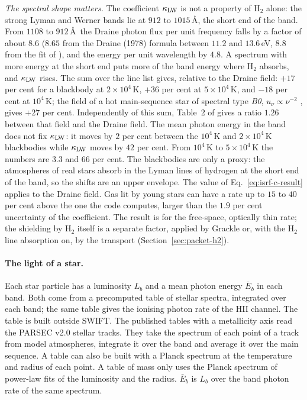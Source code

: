 \emph{The spectral shape matters.} The coefficient $\kappa_{\rm LW}$ is not a property of
H$_2$ alone: the strong Lyman and Werner bands lie at $912$ to $1015$\,\AA,
the short end of the band. From $1108$ to $912$\,\AA\ the Draine photon flux per
unit frequency falls by a factor of about $8.6$ ($8.65$ from the Draine (1978) formula between
$11.2$ and $13.6$\,eV, $8.8$ from the fit of \citealt{Sternberg2014}), and the energy per unit wavelength by $4.8$. A spectrum with more energy at the short end puts
more of the band energy where H$_2$ absorbs, and $\kappa_{\rm LW}$ rises. The sum over the
line list gives, relative to the Draine field: $+17$ per cent for a blackbody
at $2\times10^4$\,K, $+36$ per cent at $5\times10^4$\,K, and $-18$ per cent
at $10^4$\,K; the field of a hot main-sequence star of spectral type
\emph{B0}, $u_\nu\propto\nu^{-2}$
\citep{DraineBertoldi1996}, gives $+27$ per cent. Independently of this sum,
Table~2 of \citet{DraineBertoldi1996} gives a ratio $1.26$ between that field
and the Draine field. The mean photon energy in the band does not fix $\kappa_{\rm LW}$: it
moves by $2$ per cent between the $10^4$\,K and $2\times10^4$\,K blackbodies while
$\kappa_{\rm LW}$ moves by $42$ per cent. From $10^4$\,K to $5\times10^4$\,K the numbers
are $3.3$ and $66$ per cent. The blackbodies are only a proxy: the atmospheres of real stars absorb
in the Lyman lines of hydrogen at the short end of the band, so the shifts are
an upper envelope. The value of Eq.~\eqref{eq:isrf-c-result} applies to the
Draine field. Gas lit by young stars can have a rate up to $15$ to $40$ per cent above the
one the code computes, larger than the $1.9$ per cent uncertainty of the
coefficient. The result is for the free-space, optically thin rate; the
shielding by H$_2$ itself is a separate factor, applied by Grackle or, with
the H$_2$ line absorption on, by the transport
(Section~\ref{sec:packet-h2}).

\paragraph{The light of a star.} Each star particle has a luminosity $L_b$
and a mean photon energy $\bar E_b$ in each band. Both come from a
precomputed table of stellar spectra, integrated over each band; the same
table gives the ionising photon rate of the HII channel. The table is built
outside SWIFT. The published tables with a metallicity axis read the PARSEC
v2.0 stellar tracks. They take the spectrum of each point of a track from
model atmospheres, integrate it over the band and average it over the main
sequence. A table can also be built with a Planck spectrum at the temperature
and radius of each point. A table of mass only uses the Planck spectrum of
power-law fits of the luminosity and the radius. $\bar E_b$ is $L_b$ over the
band photon rate of the same spectrum.

